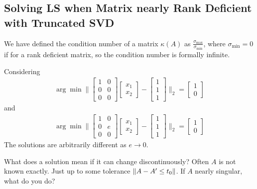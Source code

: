 \documentclass[11pt]{article}
\numberwithin{equation}{section}
\begin{document}
\subsection{Solving LS when Matrix nearly Rank Deficient with Truncated SVD}
We have defined the condition number of a matrix $\kappa(A)$ as $\frac{\sigma_{\operatorname{max}}} {\sigma_{\operatorname{min}}}$, 
where $\sigma_{\operatorname{min}}=0$ if for a rank deficient matrix, so the condition number is formally infinite.
\begin{example}
    Considering
    \begin{align*}
        \arg \min \| \left[\begin{array}{ll}
            1 & 0 \\
            0 & 0 \\
            0 & 0
            \end{array}\right] \left[\begin{array}{l}
                x_{1} \\
                x_{2}
                \end{array}\right] - \left[\begin{array}{l}
                    1 \\
                    1 \\
                    1
                    \end{array}\right] \|_2 = \left[\begin{array}{l}
                        1 \\
                        0
                        \end{array}\right]
    \end{align*}
    and 
    \begin{align*}
        \arg \min \| \left[\begin{array}{ll}
            1 & 0 \\
            0 & e \\
            0 & 0
            \end{array}\right] \left[\begin{array}{l}
                x_{1} \\
                x_{2}
                \end{array}\right] - \left[\begin{array}{l}
                    1 \\
                    1 \\
                    1
                    \end{array}\right] \|_2 = \left[\begin{array}{l}
                        1 \\
                        0
                        \end{array}\right]
    \end{align*}
    The solutions are arbitrarily different as $e \rightarrow 0$.
\end{example}
What does a solution mean if it can change discontinuously? Often $A$ is not known exactly. Just up to some tolerance $\left\| A - A^\prime \leq t_0 \right\|$. If $A$ nearly singular, what do you do?
\end{document}
